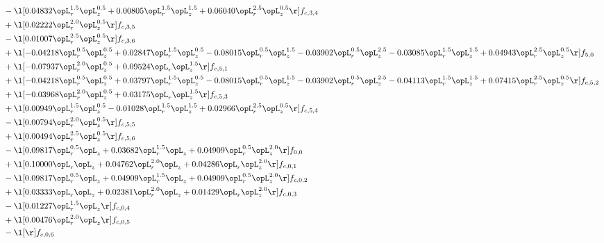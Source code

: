 \begin{alignat}{2}
& - \l[  0.04832 \opL_r^{1.5} \opL_z^{0.5} +  0.00805 \opL_r^{1.5} \opL_z^{1.5} +  0.06040 \opL_r^{2.5} \opL_z^{0.5}  \r] f_{c,3,4} \nonumber \\ 
& + \l[  0.02222 \opL_r^{2.0} \opL_z^{0.5}  \r] f_{c,3,5} \nonumber \\ 
& - \l[  0.01007 \opL_r^{2.5} \opL_z^{0.5}  \r] f_{c,3,6} \nonumber \\ 
& + \l[  -0.04218 \opL_r^{0.5} \opL_z^{0.5} +  0.02847 \opL_r^{1.5} \opL_z^{0.5}   -0.08015 \opL_r^{0.5} \opL_z^{1.5}   -0.03902 \opL_r^{0.5} \opL_z^{2.5}   -0.03085 \opL_r^{1.5} \opL_z^{1.5} +  0.04943 \opL_r^{2.5} \opL_z^{0.5}  \r] f_{5,0} \nonumber \\ 
& + \l[  -0.07937 \opL_r^{2.0} \opL_z^{0.5} +  0.09524 \opL_r \opL_z^{1.5}  \r] f_{c,5,1} \nonumber \\ 
& + \l[  -0.04218 \opL_r^{0.5} \opL_z^{0.5} +  0.03797 \opL_r^{1.5} \opL_z^{0.5}   -0.08015 \opL_r^{0.5} \opL_z^{1.5}   -0.03902 \opL_r^{0.5} \opL_z^{2.5}   -0.04113 \opL_r^{1.5} \opL_z^{1.5} +  0.07415 \opL_r^{2.5} \opL_z^{0.5}  \r] f_{c,5,2} \nonumber \\ 
& + \l[  -0.03968 \opL_r^{2.0} \opL_z^{0.5} +  0.03175 \opL_r \opL_z^{1.5}  \r] f_{c,5,3} \nonumber \\ 
& + \l[  0.00949 \opL_r^{1.5} \opL_z^{0.5}   -0.01028 \opL_r^{1.5} \opL_z^{1.5} +  0.02966 \opL_r^{2.5} \opL_z^{0.5}  \r] f_{c,5,4} \nonumber \\ 
& - \l[  0.00794 \opL_r^{2.0} \opL_z^{0.5}  \r] f_{c,5,5} \nonumber \\ 
& + \l[  0.00494 \opL_r^{2.5} \opL_z^{0.5}  \r] f_{c,5,6} \nonumber \\ 
& - \l[  0.09817 \opL_r^{0.5} \opL_z +  0.03682 \opL_r^{1.5} \opL_z +  0.04909 \opL_r^{0.5} \opL_z^{2.0}  \r] f_{0,0} \nonumber \\ 
& + \l[  0.10000 \opL_r \opL_z +  0.04762 \opL_r^{2.0} \opL_z +  0.04286 \opL_r \opL_z^{2.0}  \r] f_{c,0,1} \nonumber \\ 
& - \l[  0.09817 \opL_r^{0.5} \opL_z +  0.04909 \opL_r^{1.5} \opL_z +  0.04909 \opL_r^{0.5} \opL_z^{2.0}  \r] f_{c,0,2} \nonumber \\ 
& + \l[  0.03333 \opL_r \opL_z +  0.02381 \opL_r^{2.0} \opL_z +  0.01429 \opL_r \opL_z^{2.0}  \r] f_{c,0,3} \nonumber \\ 
& - \l[  0.01227 \opL_r^{1.5} \opL_z  \r] f_{c,0,4} \nonumber \\ 
& + \l[  0.00476 \opL_r^{2.0} \opL_z  \r] f_{c,0,5} \nonumber \\ 
& - \l[  \r] f_{c,0,6} \nonumber \\ 

\end{alignat}
